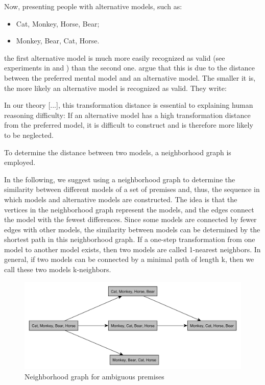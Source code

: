 \documentclass[hidelinks]{scrartcl}
\begin{document}
\noindent Now, presenting people with alternative models, such as:

\begin{itemize}
\item Cat, Monkey, Horse, Bear;
\item Monkey, Bear, Cat, Horse.
\end{itemize}

the first alternative model is much more easily recognized as valid (see experiments in \cite{Ragni.2013} and \cite{Rauh.2005}) than the second one. \cite{Ragni.2013} argue that this is due to the distance between the preferred mental model and an alternative model. The smaller it is, the more likely an alternative model is recognized as valid. They write: 

\begin{displayquote}
In our theory [...], this transformation distance is essential to explaining human reasoning difficulty: If an alternative model has a high transformation distance from the preferred model, it is difficult to construct and is therefore more likely to be neglected. \\
\citep{Ragni.2013}
\end{displayquote}

\noindent To determine the distance between two models, a neighborhood graph is employed.
\begin{displayquote}
In the following, we suggest using a neighborhood graph to determine the similarity between different models of a set of premises and, thus, the sequence in which models and alternative models are constructed. The idea is that the vertices in the neighborhood graph represent the models, and the edges connect the model with the fewest differences. Since some models are connected by fewer edges with other models, the similarity between models can be determined by the shortest path in this neighborhood graph. If a one-step transformation from one model to another model exists, then two models are called 1-nearest neighbors. In general, if two models can be connected by a minimal path of length k, then we call these two models k-neighbors. \\
\citep{Ragni.2013}
\end{displayquote}

\begin{figure}[!ht]
	\caption{Neighborhood graph for ambiguous premises}
	\label{img:neighborhood_graph}
	\centering
	\includegraphics[width=1\textwidth]{Illustrations/neighborhood_graph.png}
\end{figure}
\end{document}
